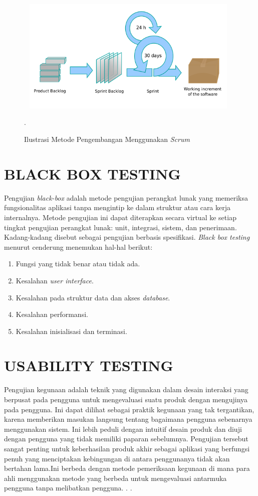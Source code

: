\vspace{0,2cm}
\begin{figure}[H]
	\centering
	\shadowbox
	{\includegraphics [width = 11cm, height= 5.5cm]{gambar/imagescrum}}
	\caption{Ilustrasi Metode Pengembangan Menggunakan \textit{Scrum} \citep{Schwab2013}}.
	\label{scrum}
\end{figure}


\section{\uppercase{BLACK BOX TESTING}}
Pengujian \textit{black-box} adalah metode pengujian perangkat lunak yang memeriksa fungsionalitas aplikasi tanpa mengintip ke dalam struktur atau cara kerja internalnya. Metode pengujian ini dapat diterapkan secara virtual ke setiap tingkat pengujian perangkat lunak: unit, integrasi, sistem, dan penerimaan. Kadang-kadang disebut sebagai pengujian berbasis spesifikasi. \textit{Black box testing} menurut \citep{Mustaqbal2015} cenderung menemukan hal-hal berikut:
\begin{enumerate}[1.]
	\item Fungsi yang tidak benar atau tidak ada.
	\item Kesalahan \textit{user interface}.
	\item Kesalahan pada struktur data dan akses \textit{database}.
	\item Kesalahan performansi.
	\item Kesalahan inisialisasi dan terminasi.
\end{enumerate}

\section{\uppercase{USABILITY TESTING}}
\par Pengujian kegunaan adalah teknik yang digunakan dalam desain interaksi yang berpusat pada pengguna untuk mengevaluasi suatu produk dengan mengujinya pada pengguna. Ini dapat dilihat sebagai praktik kegunaan yang tak tergantikan, karena memberikan masukan langsung tentang bagaimana pengguna sebenarnya menggunakan sistem. Ini lebih peduli dengan intuitif desain produk dan diuji dengan pengguna yang tidak memiliki paparan sebelumnya. Pengujian tersebut sangat penting untuk keberhasilan produk akhir sebagai aplikasi yang berfungsi penuh yang menciptakan kebingungan di antara penggunanya tidak akan bertahan lama.Ini berbeda dengan metode pemeriksaan kegunaan di mana para ahli menggunakan metode yang berbeda untuk mengevaluasi antarmuka pengguna tanpa melibatkan pengguna.
\citep{Wahl2000}.  \citep{Wesfix2017}.

